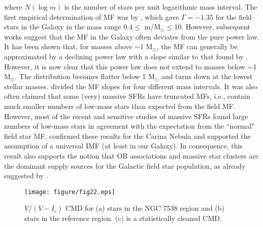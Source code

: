 \documentclass[a4paper,fleqn,usenatbib,useAMS]{mnras}
\begin{document}
\noindent
where $N (\log m)$ is the number of stars per unit logarithmic mass interval.
The first empirical determination of MF was by \citet{1955ApJ...121..161S}, which gave $\Gamma = -1.35$ for
the field stars in the Galaxy in the mass range $0.4 \leq$ m/M$_\odot \leq 10$. However, subsequent works
\citep[eg.][]{1979ApJS...41..513M, 1986FCPh...11....1S, 1991ARAA..29..129R, 2002Sci...295...82K}
suggest that the MF in the Galaxy often deviates from  the pure power law.
It has been shown \citep[see e.g.][]{1986FCPh...11....1S, 1998ASPC..142..201S, 
2002Sci...295...82K, 2003PASP..115..763C, 2005ASSL..327.....C} that, for masses above $\sim$1 M$_\odot$, the MF
can generally be approximated by a declining power law with a slope similar to
that found by \citet{1955ApJ...121..161S}. However, it is now clear that this power law does
not extend to masses below $\sim$1 M$_\odot$. The distribution becomes flatter
below 1 M$_\odot$ and turns down at the lowest stellar masses. \citet{2002Sci...295...82K} divided
the MF slopes for four different mass intervals.
It was also often claimed that some (very) massive SFRs have 
truncated MFs, i.e., contain much smaller numbers of low-mass
stars than expected from the field MF.
However, most of the recent and sensitive studies of massive SFRs
\citep[see, e.g.][]{2009MNRAS.396.1665L, 2009A&A...501..563E} found large numbers
of low-mass stars in agreement with the expectation from
the ``normal" field star MF.
\citet{2011AA...530A..34P} confirmed these results for the Carina Nebula
and supported the assumption of a universal IMF (at least in
our Galaxy). In consequence, this result also supports the notion that
OB associations and  massive star clusters are the
dominant supply sources for the Galactic field star population, as
already suggested by \citet{1978PASP...90..506M}.

\begin{figure}
\centering
\texttt{[image: figure/fig22.eps]}
\caption{\label {band} $V/(V-I_c)$ CMD for (a) stars in the NGC 7538 region and (b) stars in the reference region. (c) is a statistically cleaned CMD.  }
\end{figure}
\end{document}
